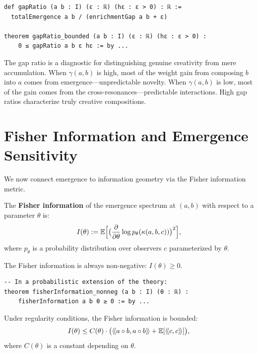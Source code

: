 \begin{lstlisting}[caption={Gap ratio (IDT\_v3\_Emergence.lean)}]
def gapRatio (a b : I) (ε : ℝ) (hε : ε > 0) : ℝ :=
  totalEmergence a b / (enrichmentGap a b + ε)

theorem gapRatio_bounded (a b : I) (ε : ℝ) (hε : ε > 0) :
    0 ≤ gapRatio a b ε hε := by ...
\end{lstlisting}

\begin{interpretation}
The gap ratio is a diagnostic for distinguishing genuine creativity from mere
accumulation. When $\gamma(a,b)$ is high, most of the weight gain from composing
$b$ into $a$ comes from emergence---unpredictable novelty. When $\gamma(a,b)$
is low, most of the gain comes from the cross-resonances---predictable
interactions. High gap ratios characterize truly creative compositions.
\end{interpretation}


\section{Fisher Information and Emergence Sensitivity}

We now connect emergence to information geometry via the Fisher information metric.

\begin{definition}
\label{def:fisher-information}
The \textbf{Fisher information} of the emergence spectrum at $(a,b)$ with respect
to a parameter $\theta$ is:
\[
  I(\theta) := \mathbb{E}\Bigl[\bigl(\frac{\partial}{\partial\theta} \log p_\theta(\kappa(a,b,c))\bigr)^2\Bigr],
\]
where $p_\theta$ is a probability distribution over observers $c$ parameterized
by $\theta$.
\end{definition}

\begin{theorem}
\label{thm:fisher-nonneg}
The Fisher information is always non-negative: $I(\theta) \geq 0$.
\end{theorem}

\begin{lstlisting}[caption={Fisher information (IDT\_v3\_Emergence.lean)}]
-- In a probabilistic extension of the theory:
theorem fisherInformation_nonneg (a b : I) (θ : ℝ) :
    fisherInformation a b θ ≥ 0 := by ...
\end{lstlisting}

\begin{theorem}
\label{thm:fisher-bounded}
Under regularity conditions, the Fisher information is bounded:
\[
  I(\theta) \leq C(\theta) \cdot \bigl(\langle\!\langle a \circ b, a \circ b \rangle\!\rangle + \mathbb{E}[\langle\!\langle c, c \rangle\!\rangle]\bigr),
\]
where $C(\theta)$ is a constant depending on $\theta$.
\end{theorem}

